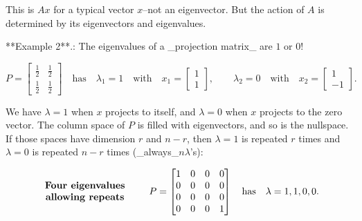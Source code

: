 This is \(Ax\) for a typical vector \(x\)--not an eigenvector. But the action of \(A\) is determined by its eigenvectors and eigenvalues.

**Example 2**.: The eigenvalues of a _projection matrix_ are \(1\) or \(0\)!

\[P=\begin{bmatrix}\frac{1}{2}&\frac{1}{2}\\ \frac{1}{2}&\frac{1}{2}\end{bmatrix}\quad\text{has}\quad\lambda_{1}=1\quad \text{with}\quad x_{1}=\begin{bmatrix}1\\ 1\end{bmatrix},\qquad\lambda_{2}=0\quad\text{with}\quad x_{2}=\begin{bmatrix} 1\\ -1\end{bmatrix}.\]

We have \(\lambda=1\) when \(x\) projects to itself, and \(\lambda=0\) when \(x\) projects to the zero vector. The column space of \(P\) is filled with eigenvectors, and so is the nullspace. If those spaces have dimension \(r\) and \(n-r\), then \(\lambda=1\) is repeated \(r\) times and \(\lambda=0\) is repeated \(n-r\) times (_always_\(n\)\(\lambda\)'s):

\[\begin{array}{c}\text{\bf Four eigenvalues}\\ \text{\bf allowing repeats}\end{array}\qquad P=\begin{bmatrix}1&0&0&0\\ 0&0&0&0\\ 0&0&0&0\\ 0&0&0&1\end{bmatrix}\quad\text{has}\quad\lambda=1,1,0,0.\] 